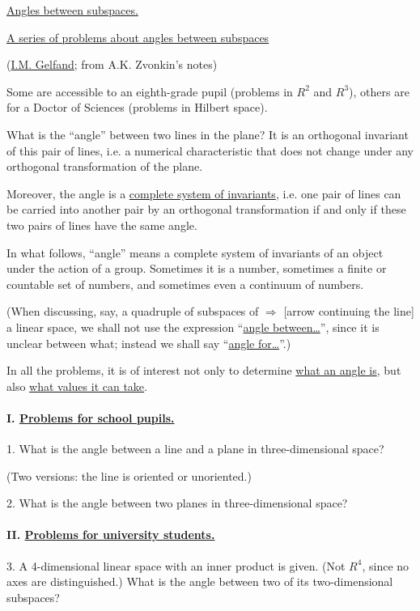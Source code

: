 \underline{Angles between subspaces.}

\begin{center}
\underline{A series of problems about angles between subspaces}

(\underline{I.M. Gelfand}; from A.K. Zvonkin's notes)
\end{center}

Some are accessible to an eighth-grade pupil (problems in $R^2$ and $R^3$),
others are for a Doctor of Sciences (problems in Hilbert space).

What is the ``angle'' between two lines in the plane?
It is an orthogonal invariant of this pair of lines, i.e. a numerical
characteristic that does not change under any orthogonal transformation
of the plane.

Moreover, the angle is a \underline{complete system of invariants}, i.e.
one pair of lines can be carried into another pair by an orthogonal transformation
if and only if these two pairs of lines have the same angle.

In what follows, ``angle'' means a complete system of
invariants of an object under the action of a group.
Sometimes it is a number, sometimes a finite or countable set of numbers,
and sometimes even a continuum of numbers.

(When discussing, say, a quadruple of subspaces of
$\Rightarrow$ [arrow continuing the line]
a linear space, we shall not use the expression ``\underline{angle between\ldots}'',
since it is unclear between what; instead we shall say ``\underline{angle for\ldots}''.)

In all the problems, it is of interest not only to determine
\underline{what an angle is}, but also \underline{what values it can
take}.

\paragraph*{I. \underline{Problems for school pupils.}}
1. What is the angle between a line and a plane in three-dimensional
space?

(Two versions: the line is oriented or unoriented.)

2. What is the angle between two planes in three-dimensional
space?

\paragraph*{II. \underline{Problems for university students.}}
3. A 4-dimensional linear space with an inner product is given.
(Not $R^4$, since no axes are distinguished.) What is the angle between two of its
two-dimensional subspaces?

